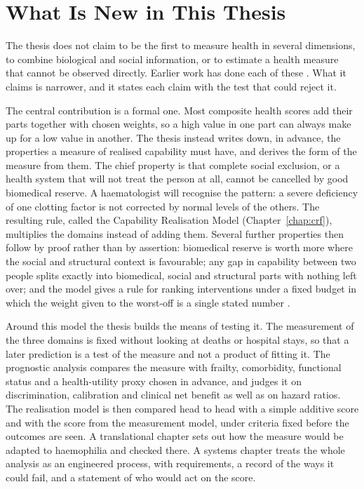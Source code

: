 \section*{What Is New in This Thesis}
\label{sec:guide-new}

The thesis does not claim to be the first to measure health in several
dimensions, to combine biological and social information, or to estimate a
health measure that cannot be observed directly. Earlier work has done each of
these \citep{caballero_athlos_2017,who_2015_ageing}. What it claims is
narrower, and it states each claim with the test that could reject it.

The central contribution is a formal one. Most composite health scores add
their parts together with chosen weights, so a high value in one part can
always make up for a low value in another. The thesis instead writes down, in
advance, the properties a measure of realised capability must have, and
derives the form of the measure from them. The chief property is that complete
social exclusion, or a health system that will not treat the person at all,
cannot be cancelled by good biomedical reserve. A haematologist will recognise
the pattern: a severe deficiency of one clotting factor is not corrected by
normal levels of the others. The resulting rule, called the
Capability Realisation Model (Chapter~\ref{chap:crf}), multiplies the domains
instead of adding them. Several further properties then follow by proof rather
than by assertion: biomedical reserve is worth more where the social and
structural context is favourable; any gap in capability between two people
splits exactly into biomedical, social and structural parts with nothing left
over; and the model gives a rule for ranking interventions under a fixed budget
in which the weight given to the worst-off is a single stated number
\citep{atkinson_1970}.

Around this model the thesis builds the means of testing it. The measurement
of the three domains is fixed without looking at deaths or hospital stays, so
that a later prediction is a test of the measure and not a product of fitting
it. The prognostic analysis compares the measure with frailty, comorbidity,
functional status and a health-utility proxy chosen in advance, and judges it
on discrimination, calibration and clinical net benefit as well as on hazard
ratios. The realisation model is then compared head to head with a simple
additive score and with the score from the measurement model, under criteria
fixed before the outcomes are seen. A translational chapter sets out how the
measure would be adapted to haemophilia and checked there. A systems chapter
treats the whole analysis as an engineered process, with requirements, a record
of the ways it could fail, and a statement of who would act on the score.

